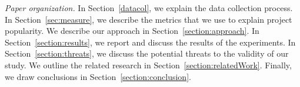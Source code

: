 \textit{Paper organization.}
In Section~\ref{datacol}, we explain the data collection process. In Section~\ref{sec:measure}, we describe the metrics that we use to explain project popularity.
We describe our approach in Section~\ref{section:approach}.
In Section~\ref{section:results}, we report and discuss the results of the experiments.
In Section~\ref{section:threats}, we discuss the potential threats to the validity of our study. We outline the related research in Section~\ref{section:relatedWork}. Finally, we draw conclusions in Section~\ref{section:conclusion}.

